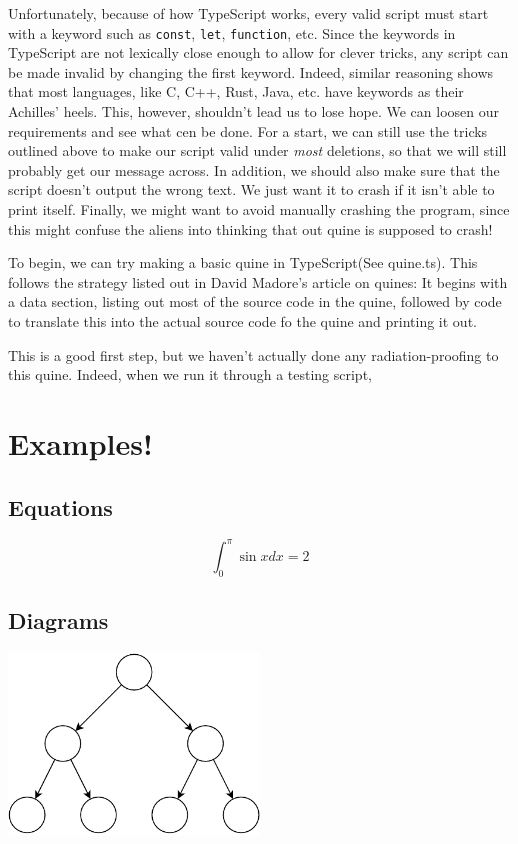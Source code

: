 \documentclass{article}
\begin{document}
Unfortunately, because of how TypeScript works, every valid script must start with a keyword such as \verb|const|, \verb|let|, \verb|function|, etc.
Since the keywords in TypeScript are not lexically close enough to allow for clever tricks, any script can be made invalid by changing the first keyword.
Indeed, similar reasoning shows that most languages, like C, C++, Rust, Java, etc. have keywords as their Achilles' heels.
This, however, shouldn't lead us to lose hope.
We can loosen our requirements and see what cen be done.
For a start, we can still use the tricks outlined above to make our script valid under \textit{most} deletions, so that we will still probably get our message across.
In addition, we should also make sure that the script doesn't output the wrong text. We just want it to crash if it isn't able to print itself.
Finally, we might want to avoid manually crashing the program, since this might confuse the aliens into thinking that out quine is supposed to crash!

To begin, we can try making a basic quine in TypeScript(See quine.ts).
This follows the strategy listed out in David Madore's article on quines:
It begins with a data section,
    listing out most of the source code in the quine,
    followed by code to translate this into the actual source code fo the quine and printing it out.

This is a good first step, but we haven't actually done any radiation-proofing to this quine.
Indeed, when we run it through a testing script, 









\section*{Examples!}

\subsection*{Equations}
$$\int_{0}^{\pi}\sin x dx = 2$$

\subsection*{Diagrams}
\begin{center}
    \includegraphics[width=0.5\textwidth]{example-figure.pdf}
\end{center}
\end{document}
